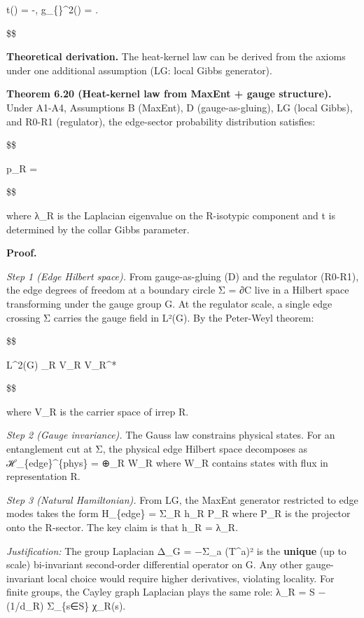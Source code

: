 \documentclass[11pt,a4paper]{article}
\theoremstyle{remark}
\begin{document}
t(\mu) = -, \qquad
g\_\{\}\^{}2(\mu) = .

\$\$

\textbf{Theoretical derivation.} The heat-kernel law can be derived from the axioms
under one additional assumption (LG: local Gibbs generator).

\textbf{Theorem 6.20 (Heat-kernel law from MaxEnt + gauge structure).} Under A1-A4,
Assumptions B (MaxEnt), D (gauge-as-gluing), LG (local Gibbs), and R0-R1
(regulator), the edge-sector probability distribution satisfies:

\$\$

p\_R = 

\$\$

where λ\_R is the Laplacian eigenvalue on the R-isotypic component
and t is determined by the collar Gibbs parameter.

\textbf{Proof.}

\emph{Step 1 (Edge Hilbert space).} From gauge-as-gluing (D) and the regulator
(R0-R1), the edge degrees of freedom at a boundary circle Σ = ∂C
live in a Hilbert space transforming under the gauge group G. At the
regulator scale, a single edge crossing Σ carries the gauge field in
L²(G). By the Peter-Weyl theorem:

\$\$

L\^{}2(G) \cong \bigoplus\_R V\_R \otimes V\_R\^{}*

\$\$

where V\_R is the carrier space of irrep R.

\emph{Step 2 (Gauge invariance).} The Gauss law constrains physical states. For an
entanglement cut at Σ, the physical edge Hilbert space decomposes as
ℋ\_\{edge\}\^{}\{phys\} = ⊕\_R W\_R where W\_R
contains states with flux in representation R.

\emph{Step 3 (Natural Hamiltonian).} From LG, the MaxEnt generator restricted to
edge modes takes the form H\_\{edge\} = Σ\_R h\_R P\_R where P\_R is
the projector onto the R-sector. The key claim is that h\_R = λ\_R.

\emph{Justification:} The group Laplacian Δ\_G = −Σ\_a (T\^{}a)² is the
\textbf{unique} (up to scale) bi-invariant second-order differential operator on
G. Any other gauge-invariant local choice would require higher derivatives,
violating locality. For finite groups, the Cayley graph Laplacian plays the
same role: λ\_R = \textbar S\textbar{} − (1/d\_R) Σ\_\{s∈S\} χ\_R(s).
\end{document}
